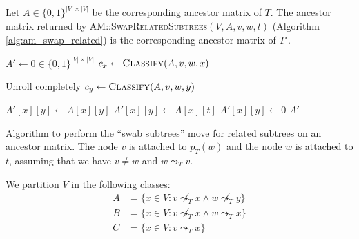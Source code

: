\begin{theorem}
    \label{theo:swap_related_correctness}
    Let $A \in \{0,1\}^{|V| \times |V|}$ be the corresponding ancestor matrix of $T$. The ancestor matrix returned by \textsc{AM::Swap\-Related\-Subtrees}$(V, A, v, w, t)$ (Algorithm \ref{alg:am_swap_related}) is the corresponding ancestor matrix of $T'$.
\end{theorem}

\begin{algorithm}
    \begin{algorithmic}[1]
                \State {}
                \State {}
            \Else
                \State {}
            \EndIf
        \EndFunction
        \State
        \State $A' \leftarrow 0 \in \{0,1\}^{|V| \times |V|}$
            \State $c_x \leftarrow \textsc{Classify}(A, v, w, x)$

             \Comment Unroll completely
                \State $c_y \leftarrow \textsc{Classify}(A, v, w, y)$

                    \State $A'[x][y] \leftarrow A[x][y]$
                    \State $A'[x][y] \leftarrow A[x][t]$
                \Else
                    \State $A'[x][y] \leftarrow 0$
                \EndIf
            \EndFor
        \EndFor
        \State \Return $A'$
        \EndFunction
    \end{algorithmic}
    \caption{Algorithm to perform the ``swab subtrees'' move for related subtrees on an ancestor matrix. The node $v$ is attached to $p_T(w)$ and the node $w$ is attached to $t$, assuming that we have $v \neq w$ and $w \leadsto_T v$.}
    \label{alg:am_swap_related}
\end{algorithm}

\begin{definition}
    \label{def:related_swap_classes}
    We partition $V$ in the following classes:
    \begin{align*}
      A &= \{x \in V: v \not\leadsto_T x \wedge w \not\leadsto_T y\} \\
      B &= \{x \in V: v \not\leadsto_T x \wedge w \leadsto_T x\} \\
      C &= \{x \in V: v \leadsto_T x\}
    \end{align*}
\end{definition}

